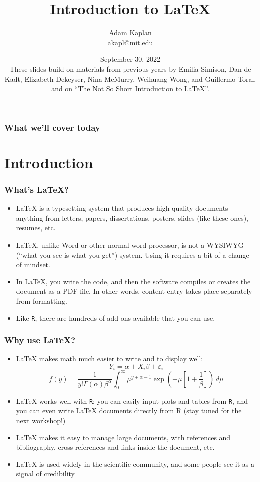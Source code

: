 \documentclass[xcolor=dvipsnames]{beamer} %
\title{Introduction to \LaTeX}
\author[Kaplan]{Adam Kaplan\\akapl@mit.edu}
\date[Sept 30, 2020]{September 30, 2022\\ \vspace{1em} {\footnotesize These slides build on materials from
    previous years by Emilia Simison, Dan de Kadt, Elizabeth Dekeyser, Nina McMurry, Weihuang Wong, and Guillermo Toral, and on \href{https://tobi.oetiker.ch/lshort/lshort.pdf}{``The Not So Short Introduction to \LaTeX{}''}.}}
\begin{document}

\frame{\titlepage}


\begin{frame}
  \frametitle{What we'll cover today}
  \tableofcontents
\end{frame}

\section{Introduction}

\begin{frame}
  \frametitle{What's \LaTeX?}
  \begin{itemize}
    \item \LaTeX{} is a typesetting system that produces high-quality documents --
          anything from letters, papers, dissertations, posters, slides (like
          these ones), resumes, etc. \pause
    \item \LaTeX, unlike Word or other normal word processor, is not a WYSIWYG (``what you see is what
          you get'') system. Using it requires a bit of a change of mindset. \pause
    \item In \LaTeX, you write the code, and then the software compiles or creates
          the document as a PDF file.  In other words, content entry takes place separately from formatting.
          \pause
    \item Like \texttt{R}, there are hundreds of add-ons available that you can use.
  \end{itemize}
\end{frame}


\begin{frame}
  \frametitle{Why use \LaTeX?}
  \begin{itemize}
    \item \LaTeX{} makes math much easier to write and to display well: \pause
          $$ Y_{i} = \alpha + X_i\beta + \varepsilon_i $$ \pause
          $$ f(y) = \frac{1}{y!\Gamma(\alpha)\beta^\alpha}\int_{0}^{\infty} \mu^{y+\alpha-1} \exp\left(-\mu\left[1+\frac{1}{\beta}\right]\right)\,d\mu $$ \pause
    \item \LaTeX{} works well with \texttt{R}: you can easily input plots and tables
          from \texttt{R}, and you can even write \LaTeX{} documents directly from R (stay tuned for the next workshop!) \pause
    \item \LaTeX{} makes it easy to manage large documents, with references
          and bibliography, cross-references and links inside the document, etc. \pause
    \item \LaTeX{} is used widely in the scientific community, and some people see it as a signal of credibility
  \end{itemize}
\end{frame}
\end{document}
